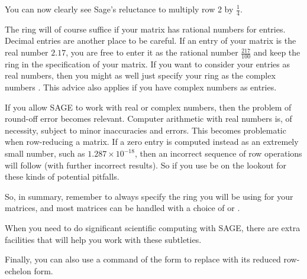 %
You can now clearly see Sage's reluctance to multiply row 2 by $\frac{1}{4}$.\par
%
The ring  will of course suffice if your matrix has rational numbers for entries.  Decimal entries are another place to be careful.  If an entry of your matrix is the real number $2.17$, you are free to enter it as the rational number $\frac{217}{100}$ and keep the ring  in the specification of your matrix.  If you want to consider your entries as real numbers, then you might as well just specify your ring as the complex numbers .  This advice also applies if you have complex numbers as entries.\par
%
If you allow SAGE to work with real or complex numbers, then the problem of round-off error becomes relevant.  Computer arithmetic with real numbers is, of necessity, subject to minor inaccuracies and errors.  This becomes problematic when row-reducing a matrix.  If a zero entry is computed instead as an extremely small number, such as $1.287\times 10^{-18}$, then  an incorrect sequence of row operations will follow (with further incorrect results).  So if you use  be on the lookout for these kinds of potential pitfalls.\par
%
So, in summary, remember to always specify the ring you will be using for your matrices, and most matrices can be handled with a choice of  or .\par
%
When you need to do significant scientific computing with SAGE, there are extra facilities that will help you work with these subtleties.\par
%
Finally, you can also use a command of the form  to replace  with its reduced row-echelon form.
